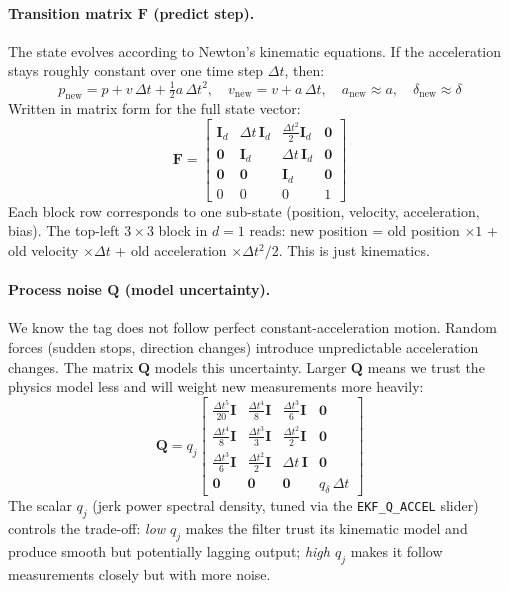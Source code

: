 \documentclass[11pt,a4paper]{article}
\newcommand{\vect}[1]{\bm{#1}}
\newcommand{\mat}[1]{\mathbf{#1}}
\begin{document}
\paragraph{Transition matrix $\mat{F}$ (predict step).} The state evolves according to Newton's kinematic equations. If the acceleration stays roughly constant over one time step $\Delta t$, then:
\[
p_\text{new} = p + v\,\Delta t + \tfrac{1}{2}a\,\Delta t^2, \quad v_\text{new} = v + a\,\Delta t, \quad a_\text{new} \approx a, \quad \delta_\text{new} \approx \delta
\]
Written in matrix form for the full state vector:
\begin{equation}
\mat{F} = \begin{bmatrix}
\mat{I}_d & \Delta t\,\mat{I}_d & \tfrac{\Delta t^2}{2}\mat{I}_d & \vect{0} \\
\mat{0}   & \mat{I}_d           & \Delta t\,\mat{I}_d            & \vect{0} \\
\mat{0}   & \mat{0}             & \mat{I}_d                      & \vect{0} \\
0         & 0                   & 0                              & 1
\end{bmatrix}
\end{equation}
Each block row corresponds to one sub-state (position, velocity, acceleration, bias). The top-left $3\times3$ block in $d=1$ reads: new position = old position $\times 1$ + old velocity $\times \Delta t$ + old acceleration $\times \Delta t^2/2$. This is just kinematics.

\paragraph{Process noise $\mat{Q}$ (model uncertainty).} We know the tag does not follow perfect constant-acceleration motion. Random forces (sudden stops, direction changes) introduce unpredictable acceleration changes. The matrix $\mat{Q}$ models this uncertainty. Larger $\mat{Q}$ means we trust the physics model less and will weight new measurements more heavily:
\begin{equation}
\mat{Q} = q_j \begin{bmatrix}
\tfrac{\Delta t^5}{20}\mat{I} & \tfrac{\Delta t^4}{8}\mat{I} & \tfrac{\Delta t^3}{6}\mat{I} & \vect{0} \\
\tfrac{\Delta t^4}{8}\mat{I}  & \tfrac{\Delta t^3}{3}\mat{I} & \tfrac{\Delta t^2}{2}\mat{I} & \vect{0} \\
\tfrac{\Delta t^3}{6}\mat{I}  & \tfrac{\Delta t^2}{2}\mat{I} & \Delta t\,\mat{I}             & \vect{0} \\
\vect{0} & \vect{0} & \vect{0} & q_\delta\,\Delta t
\end{bmatrix}
\end{equation}
The scalar $q_j$ (jerk power spectral density, tuned via the \texttt{EKF\_Q\_ACCEL} slider) controls the trade-off: \emph{low $q_j$} makes the filter trust its kinematic model and produce smooth but potentially lagging output; \emph{high $q_j$} makes it follow measurements closely but with more noise.
\end{document}
